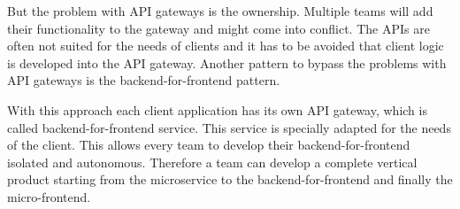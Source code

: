 But the problem with API gateways is the ownership. Multiple teams will add their functionality to the gateway and might come into conflict. The APIs are often not suited for the needs of clients and it has to be avoided that client logic is developed into the API gateway. Another pattern to bypass the problems with API gateways is the backend-for-frontend pattern. \cite{book:2018:richardson:microservices-patterns}

With this approach each client application has its own API gateway, which is called backend-for-frontend service. This service is specially adapted for the needs of the client. \cite{book:2018:richardson:microservices-patterns} \cite{book:2021:newman:background:bff:micro-services} This allows every team to develop their backend-for-frontend isolated and autonomous. Therefore a team can develop a complete vertical product starting from the microservice to the backend-for-frontend and finally the micro-frontend. \cite{book:2020:geers:micro-frontends-in-action}

